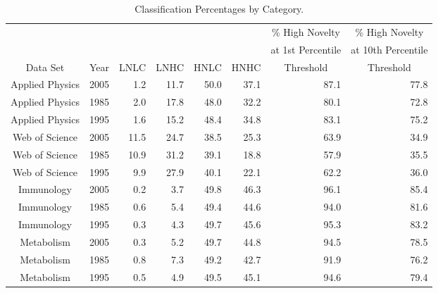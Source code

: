\documentclass[11pt]{article}
\begin{document}
\begin{table}%
\centering
\caption[Category Population]{Classification Percentages by Category. } \label{Tab:CatPerc}
\begin{tabular}{crrrrrrr}
&  &  &  &  &  & \multicolumn{1}{c}{\% High Novelty}  & \multicolumn{1}{c}{\% High Novelty} \\ 
 &  &  &  &  &  & \multicolumn{1}{c}{at 1st Percentile}  & \multicolumn{1}{c}{at 10th Percentile}  \\ 
Data Set & \multicolumn{1}{c}{Year} & \multicolumn{1}{c}{LNLC} & \multicolumn{1}{c}{LNHC} & \multicolumn{1}{c}{HNLC} & \multicolumn{1}{c}{HNHC} & \multicolumn{1}{c}{Threshold}  & \multicolumn{1}{c}{Threshold}  \\ \hline
   
Applied Physics & 2005& 1.2& 11.7& 50.0& 37.1& 87.1& 77.8 \\ 
Applied Physics & 1985& 2.0& 17.8& 48.0& 32.2& 80.1& 72.8 \\ 
Applied Physics & 1995& 1.6& 15.2& 48.4& 34.8& 83.1& 75.2 \\ 
Web of Science & 2005& 11.5& 24.7& 38.5& 25.3& 63.9& 34.9 \\ 
Web of Science & 1985& 10.9& 31.2& 39.1& 18.8& 57.9& 35.5 \\ 
Web of Science & 1995& 9.9& 27.9& 40.1& 22.1& 62.2& 36.0 \\ 
Immunology & 2005& 0.2& 3.7& 49.8& 46.3& 96.1& 85.4 \\ 
Immunology & 1985& 0.6& 5.4& 49.4& 44.6& 94.0& 81.6 \\ 
Immunology & 1995& 0.3& 4.3& 49.7& 45.6& 95.3& 83.2 \\ 
Metabolism & 2005& 0.3& 5.2& 49.7& 44.8& 94.5& 78.5 \\ 
Metabolism & 1985& 0.8& 7.3& 49.2& 42.7& 91.9& 76.2 \\ 
Metabolism & 1995& 0.5& 4.9& 49.5& 45.1& 94.6& 79.4 \\  \hline

\end{tabular}
\end{table}
\end{document}
